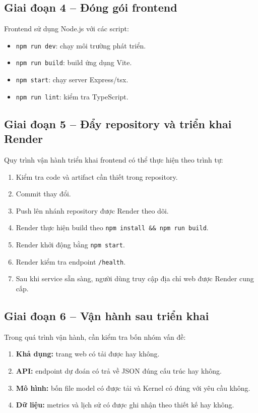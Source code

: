 \documentclass{article}
\begin{document}
	\subsection{Giai đoạn 4 -- Đóng gói frontend}
	\hspace{0.5cm}
	Frontend sử dụng Node.js với các script:
	\begin{itemize}
		\item \texttt{npm run dev}: chạy môi trường phát triển.
		\item \texttt{npm run build}: build ứng dụng Vite.
		\item \texttt{npm start}: chạy server Express/tsx.
		\item \texttt{npm run lint}: kiểm tra TypeScript.
	\end{itemize}
	
	\subsection{Giai đoạn 5 -- Đẩy repository và triển khai Render}
	\hspace{0.5cm}
	Quy trình vận hành triển khai frontend có thể thực hiện theo trình tự:
	\begin{enumerate}
		\item Kiểm tra code và artifact cần thiết trong repository.
		\item Commit thay đổi.
		\item Push lên nhánh repository được Render theo dõi.
		\item Render thực hiện build theo \texttt{npm install \&\& npm run build}.
		\item Render khởi động bằng \texttt{npm start}.
		\item Render kiểm tra endpoint \texttt{/health}.
		\item Sau khi service sẵn sàng, người dùng truy cập địa chỉ web được Render cung cấp.
	\end{enumerate}
	
	\subsection{Giai đoạn 6 -- Vận hành sau triển khai}
	\hspace{0.5cm}
	Trong quá trình vận hành, cần kiểm tra bốn nhóm vấn đề:
	\begin{enumerate}
		\item \textbf{Khả dụng:} trang web có tải được hay không.
		\item \textbf{API:} endpoint dự đoán có trả về JSON đúng cấu trúc hay không.
		\item \textbf{Mô hình:} bốn file model có được tải và Kernel có đúng với yêu cầu không.
		\item \textbf{Dữ liệu:} metrics và lịch sử có được ghi nhận theo thiết kế hay không.
	\end{enumerate}
	
\end{document}
